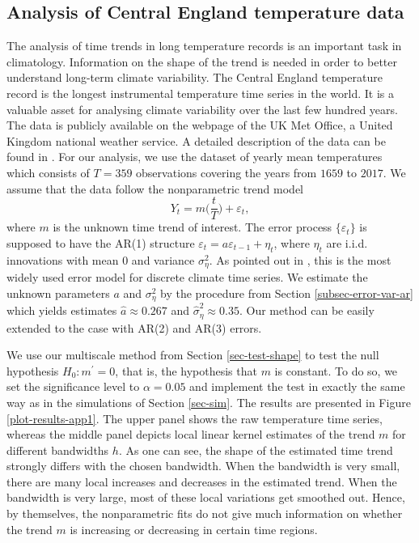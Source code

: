 \subsection{Analysis of Central England temperature data}\label{subsec-data-1} 


The analysis of time trends in long temperature records is an important task in climatology. Information on the shape of the trend is needed in order to better understand long-term climate variability. The Central England temperature record is the longest instrumental temperature time series in the world. It is a valuable asset for analysing climate variability over the last few hundred years. The data is publicly available on the webpage of the UK Met Office, a United Kingdom national weather service. A detailed description of the data can be found in \cite{Parker1992}. For our analysis, we use the dataset of yearly mean temperatures which consists of $T=359$ observations covering the years from $1659$ to $2017$. We assume that the data follow the nonparametric trend model 
\[ Y_t = m\Big(\frac{t}{T}\Big) + \varepsilon_t, \]
where $m$ is the unknown time trend of interest. The error process $\{ \varepsilon_t \}$ is supposed to have the AR(1) structure $\varepsilon_t = a \varepsilon_{t-1} + \eta_t$, where $\eta_t$ are i.i.d. innovations with mean $0$ and variance $\sigma_\eta^2$. As pointed out in \cite{Mudelsee2010}, this is the most widely used error model for discrete climate time series. We estimate the unknown parameters $a$ and $\sigma_\eta^2$ by the procedure from Section \ref{subsec-error-var-ar} which yields estimates $\widehat{a} \approx 0.267$ and $\widehat{\sigma}_\eta^2 \approx 0.35$. Our method can be easily extended to the case with AR(2) and AR(3) errors.


We use our multiscale method from Section \ref{sec-test-shape} to test the null hypothesis $H_0: m^\prime = 0$, that is, the hypothesis that $m$ is constant. To do so, we set the significance level to $\alpha = 0.05$ and implement the test in exactly the same way as in the simulations of Section \ref{sec-sim}. The results are presented in Figure \ref{plot-results-app1}. The upper panel shows the raw temperature time series, whereas the middle panel depicts local linear kernel estimates of the trend $m$ for different bandwidths $h$. As one can see, the shape of the estimated time trend strongly differs with the chosen bandwidth. When the bandwidth is very small, there are many local increases and decreases in the estimated trend. When the bandwidth is very large, most of these local variations get smoothed out. Hence, by themselves, the nonparametric fits do not give much information on whether the trend $m$ is increasing or decreasing in certain time regions. 


